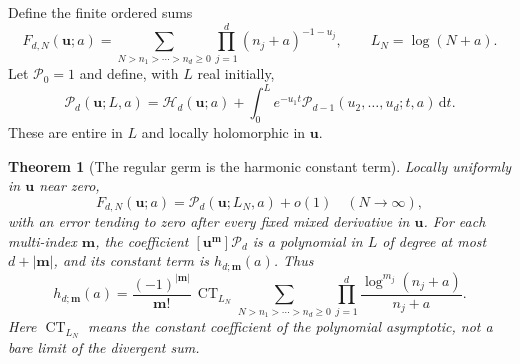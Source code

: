 \documentclass[11pt,a4paper]{article}
\numberwithin{equation}{section}
\newtheorem{theorem}{Theorem}[section]
\theoremstyle{definition}\newtheorem{definition}[theorem]{Definition}
\theoremstyle{remark}\newtheorem{remark}[theorem]{Remark}
\DeclareMathOperator{\CT}{CT}
\newcommand{\HH}{\mathcal H}
\newcommand{\PP}{\mathcal P}
\newcommand{\dd}{\,\mathrm d}
\begin{document}
Define the finite ordered sums
\begin{equation}\label{eq:FN}
 F_{d,N}(\bm u;a)=
 \sum_{N>n_1>\cdots>n_d\ge0}\prod_{j=1}^{d}(n_j+a)^{-1-u_j},
 \qquad L_N=\log(N+a).
\end{equation}
Let $\PP_0=1$ and define, with $L$ real initially,
\begin{equation}\label{eq:Pcut}
 \PP_d(\bm u;L,a)=\HH_d(\bm u;a)
   +\int_0^L e^{-u_1t}\PP_{d-1}(u_2,\ldots,u_d;t,a)\dd t.
\end{equation}
These are entire in $L$ and locally holomorphic in $\bm u$.

\begin{theorem}[The regular germ is the harmonic constant term]
\label{thm:cutoff}
Locally uniformly in $\bm u$ near zero,
\begin{equation}\label{eq:cutasym}
 F_{d,N}(\bm u;a)=\PP_d(\bm u;L_N,a)+o(1)
 \quad(N\to\infty),
\end{equation}
with an error tending to zero after every fixed mixed derivative in
$\bm u$. For each multi-index $\bm m$, the coefficient
$[\bm u^{\bm m}]\PP_d$ is a polynomial in $L$ of degree at most
$d+|\bm m|$, and its constant term is $h_{d;\bm m}(a)$. Thus
\begin{equation}\label{eq:logCT}
 \boxed{\displaystyle
 h_{d;\bm m}(a)=\frac{(-1)^{|\bm m|}}{\bm m!}\,
 \CT_{L_N}
 \sum_{N>n_1>\cdots>n_d\ge0}
       \prod_{j=1}^{d}\frac{\log^{m_j}(n_j+a)}{n_j+a}.}
\end{equation}
Here $\CT_{L_N}$ means the constant coefficient of the polynomial
asymptotic, not a bare limit of the divergent sum.
\end{theorem}
\end{document}
